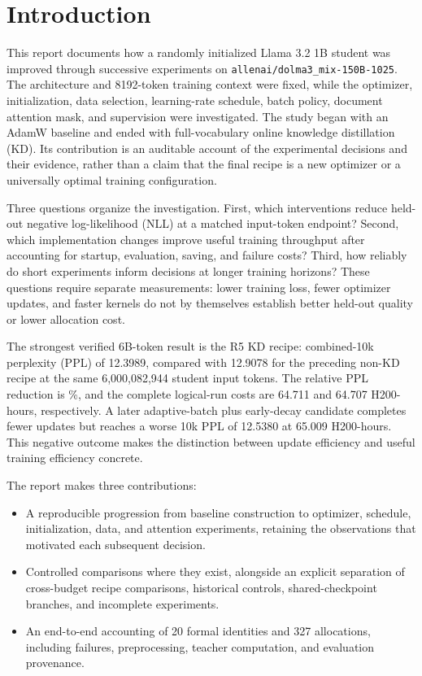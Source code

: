 \section{Introduction}
\label{sec:introduction}

This report documents how a randomly initialized Llama 3.2 1B student was improved through successive experiments on \texttt{allenai/dolma3\_mix-150B-1025}. The architecture and 8192-token training context were fixed, while the optimizer, initialization, data selection, learning-rate schedule, batch policy, document attention mask, and supervision were investigated. The study began with an AdamW baseline and ended with full-vocabulary online knowledge distillation (KD). Its contribution is an auditable account of the experimental decisions and their evidence, rather than a claim that the final recipe is a new optimizer or a universally optimal training configuration.

Three questions organize the investigation. First, which interventions reduce held-out negative log-likelihood (NLL) at a matched input-token endpoint? Second, which implementation changes improve useful training throughput after accounting for startup, evaluation, saving, and failure costs? Third, how reliably do short experiments inform decisions at longer training horizons? These questions require separate measurements: lower training loss, fewer optimizer updates, and faster kernels do not by themselves establish better held-out quality or lower allocation cost.

The strongest verified 6B-token result is the R5 KD recipe: combined-10k perplexity (PPL) of 12.3989, compared with 12.9078 for the preceding non-KD recipe at the same 6,000,082,944 student input tokens. The relative PPL reduction is \KDImprovement\%, and the complete logical-run costs are 64.711 and 64.707 H200-hours, respectively. A later adaptive-batch plus early-decay candidate completes fewer updates but reaches a worse 10k PPL of 12.5380 at 65.009 H200-hours. This negative outcome makes the distinction between update efficiency and useful training efficiency concrete.

The report makes three contributions:
\begin{itemize}
  \item A reproducible progression from baseline construction to optimizer, schedule, initialization, data, and attention experiments, retaining the observations that motivated each subsequent decision.
  \item Controlled comparisons where they exist, alongside an explicit separation of cross-budget recipe comparisons, historical controls, shared-checkpoint branches, and incomplete experiments.
  \item An end-to-end accounting of 20 formal identities and 327 allocations, including failures, preprocessing, teacher computation, and evaluation provenance.
\end{itemize}


